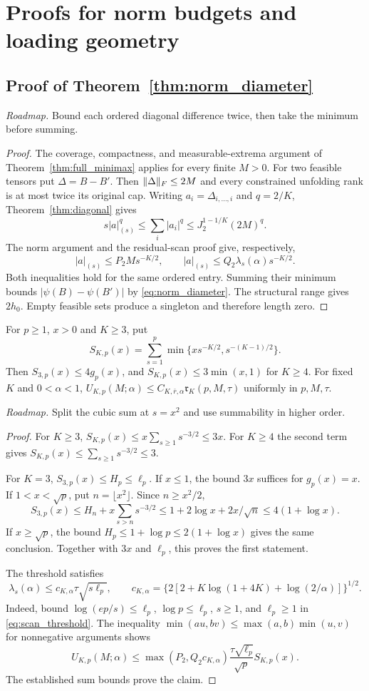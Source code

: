 \section{Proofs for norm budgets and loading geometry}\label{app:norm_loading}

\subsection{Proof of Theorem~\ref{thm:norm_diameter}}
\noindent\emph{Roadmap.} Bound each ordered diagonal difference twice, then take the minimum before summing.
\begin{proof}
The coverage, compactness, and measurable-extrema argument of Theorem~\ref{thm:full_minimax} applies for every finite $M>0$. For two feasible tensors put $\Delta=B-B'$. Then $\lVert \Delta\rVert_F\le2M$ and every constrained unfolding rank is at most twice its original cap. Writing $a_i=\Delta_{i,\ldots,i}$ and $q=2/K$, Theorem~\ref{thm:diagonal} gives
\[
 s|a|_{(s)}^q\le\sum_i|a_i|^q
       \le J_2^{1-1/K}(2M)^q.
\]
The norm argument and the residual-scan proof give, respectively,
\[
|a|_{(s)}\le P_2M s^{-K/2},\qquad
|a|_{(s)}\le Q_2\lambda_s(\alpha)s^{-K/2}.
\]
Both inequalities hold for the same ordered entry. Summing their minimum bounds $|\psi(B)-\psi(B')|$ by \eqref{eq:norm_diameter}. The structural range gives $2h_0$. Empty feasible sets produce a singleton and therefore length zero.
\end{proof}

\begin{lemma}\label{lem:norm_sum}
For $p\ge1$, $x>0$ and $K\ge3$, put
\[
 S_{K,p}(x)=\sum_{s=1}^p\min\{x s^{-K/2},s^{-(K-1)/2}\}.
\]
Then $S_{3,p}(x)\le4g_p(x)$, and $S_{K,p}(x)\le3\min(x,1)$ for $K\ge4$.
For fixed $K$ and $0<\alpha<1$,
$U_{K,p}(M;\alpha)\le C_{K,\bar r,\alpha}\mathfrak r_K(p,M,\tau)$ uniformly in $p,M,\tau$.
\end{lemma}
\noindent\emph{Roadmap.} Split the cubic sum at $s=x^2$ and use summability in higher order.
\begin{proof}
For $K\ge3$, $S_{K,p}(x)\le x\sum_{s\ge1}s^{-3/2}\le3x$. For $K\ge4$ the second term gives $S_{K,p}(x)\le\sum_{s\ge1}s^{-3/2}\le3$.

For $K=3$, $S_{3,p}(x)\le H_p\le\ell_p$. If $x\le1$, the bound $3x$ suffices for $g_p(x)=x$. If $1<x<\sqrt p$, put $n=\lfloor x^2\rfloor$. Since $n\ge x^2/2$,
\[
 S_{3,p}(x)\le H_n+x\sum_{s>n}s^{-3/2}
 \le1+2\log x+2x/\sqrt n
 \le4(1+\log x).
\]
If $x\ge\sqrt p$, the bound $H_p\le1+\log p\le2(1+\log x)$ gives the same conclusion. Together with $3x$ and $\ell_p$, this proves the first statement.

The threshold satisfies
\[
 \lambda_s(\alpha)\le c_{K,\alpha}\tau\sqrt{s\ell_p},\qquad
 c_{K,\alpha}=\{2[2+K\log(1+4K)+\log(2/\alpha)]\}^{1/2}.
\]
Indeed, bound $\log(ep/s)\le\ell_p$, $\log p\le\ell_p$, $s\ge1$, and $\ell_p\ge1$ in \eqref{eq:scan_threshold}. The inequality
$\min(au,bv)\le\max(a,b)\min(u,v)$ for nonnegative arguments shows
\[
 U_{K,p}(M;\alpha)\le
 \max(P_2,Q_2c_{K,\alpha})\frac{\tau\sqrt{\ell_p}}{\sqrt p}
 S_{K,p}(x).
\]
The established sum bounds prove the claim.
\end{proof}

